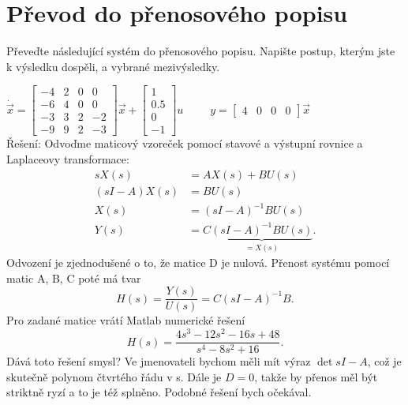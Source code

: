 \documentclass[twoside]{article}
\begin{document}
\section{ Převod do přenosového popisu}
\label{sec:ukol5}
Převeďte následující systém do přenosového popisu. Napište postup, kterým jste k výsledku dospěli, a vybrané mezivýsledky.

\begin{math}
	\dot{\vec{x}} = \begin{bmatrix}
		-4 & 2 & 0 & 0 \\
		-6 & 4 & 0 & 0 \\
		-3 & 3 & 2 & -2 \\
		-9 & 9 & 2 & -3
	\end{bmatrix} \vec{x} + \begin{bmatrix}
		1 \\
		0.5 \\
	0 \\
	-1
\end{bmatrix} u ~~~~~~~~~~~
y = \begin{bmatrix}
	4 & 0 & 0 & 0
\end{bmatrix} \vec{x}
\end{math} \\
Řešení: Odvoďme maticový vzoreček pomocí stavové a výstupní rovnice a Laplaceovy transformace:
\begin{equation*}
	\begin{split}
		sX(s) &= AX(s) + B U(s) \\
		(sI - A) X(s) &= BU(s) \\
		X(s) &= (sI - A)^{-1} B U(s) \\
		Y(s) &= C \underbrace{(sI - A)^{-1} B U(s)}_{=X(s)}.
	\end{split}
\end{equation*}
Odvození je zjednodušené o to, že matice D je nulová. Přenost systému pomocí matic A, B, C poté má tvar
\begin{equation}
	H(s) = \frac{Y(s)}{U(s)} = C(sI-A)^{-1} B.
\end{equation}
Pro zadané matice vrátí Matlab numerické řešení
\begin{equation*}
	H(s) = \frac{4 s^3 - 12 s^2 - 16s + 48}{s^4 - 8 s^2 + 16}.
\end{equation*}
Dává toto řešení smysl? Ve jmenovateli bychom měli mít výraz $ \det{sI - A}$, což je skutečně polynom čtvrtého
řádu v s. Dále je $D = 0$, takže by přenos měl být striktně ryzí a to je též splněno. Podobné řešení bych očekával.
\end{document}
